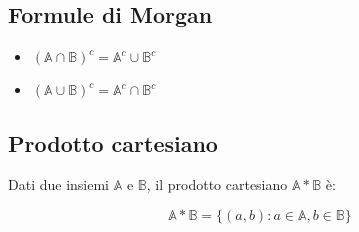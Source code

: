\documentclass{subfiles}
\begin{document}
\subsection{Formule di Morgan}

\begin{itemize}
    \item $(\mathbb{A} \cap \mathbb{B})^c = \mathbb{A}^c \cup \mathbb{B}^c$
    \item $(\mathbb{A} \cup \mathbb{B})^c = \mathbb{A}^c \cap \mathbb{B}^c$
\end{itemize}

\subsection{Prodotto cartesiano}

Dati due insiemi $\mathbb{A}$ e $\mathbb{B}$, il prodotto cartesiano $\mathbb{A} * \mathbb{B}$ è:

$$
\mathbb{A} * \mathbb{B} = \{ (a,b) : a \in \mathbb{A}, b \in \mathbb{B} \}
$$
\end{document}
